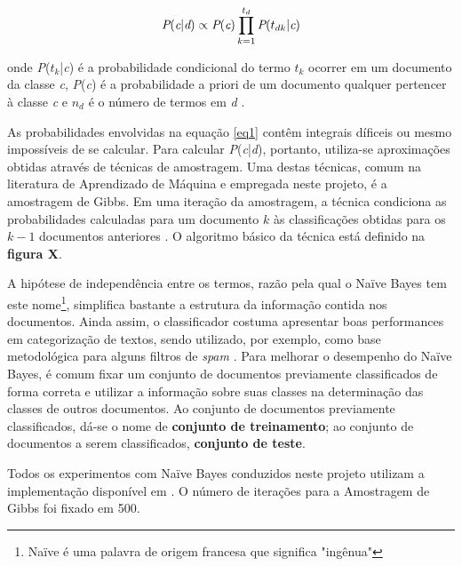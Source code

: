 \begin{equation}
\label{eq1}
\emph{P}(\emph{c}|\emph{d}) \ensuremath{\propto} \emph{P}(\emph{c})\prod_{k=1}^{\ensuremath{t_d}}\emph{P}(\ensuremath{t_{dk}}|\emph{c})  
\end{equation} 

onde \emph{P}(\ensuremath{t_k}|\emph{c}) é a probabilidade condicional do termo \ensuremath{t_k}  ocorrer em um documento da classe \emph{c},  \emph{P}(\emph{c}) é a probabilidade a priori de um documento qualquer pertencer à classe \emph{c} e \ensuremath{n_d} é o número de termos em \emph{d} \cite{stanford-IRbook}.

As probabilidades envolvidas na equação \ref{eq1} contêm integrais díficeis ou mesmo impossíveis de se calcular. Para calcular \emph{P}(\emph{c}|\emph{d}), portanto, utiliza-se aproximações obtidas através de técnicas de amostragem. Uma destas técnicas, comum na literatura de Aprendizado de Máquina e empregada neste projeto, é a amostragem de Gibbs. Em uma iteração da amostragem, a técnica condiciona as probabilidades calculadas para um documento \ensuremath{k} às classificações obtidas para os \ensuremath{k - 1} documentos anteriores \cite{resnik-gibbs}. O algoritmo básico da técnica está definido na \textbf{figura X}.


A hipótese de independência entre os termos, razão pela qual o Naïve Bayes tem este nome\footnote{Naïve é uma palavra de origem francesa que significa "ingênua"}, simplifica bastante a estrutura da informação contida nos documentos. Ainda assim, o classificador costuma apresentar boas performances em categorização de textos, sendo utilizado, por exemplo, como base metodológica para alguns filtros de \emph{spam} \cite{paul}. Para melhorar o desempenho do Naïve Bayes, é comum fixar um conjunto de documentos previamente classificados de forma correta e utilizar a informação sobre suas classes na determinação das classes de outros documentos. Ao conjunto de documentos previamente classificados, dá-se o nome de \textbf{conjunto de treinamento}; ao conjunto de documentos a serem classificados, \textbf{conjunto de teste}.

Todos os experimentos com Naïve Bayes conduzidos neste projeto utilizam a implementação disponível em \cite{alibezz-nb}. O número de iterações para a Amostragem de Gibbs foi fixado em 500. %
 
